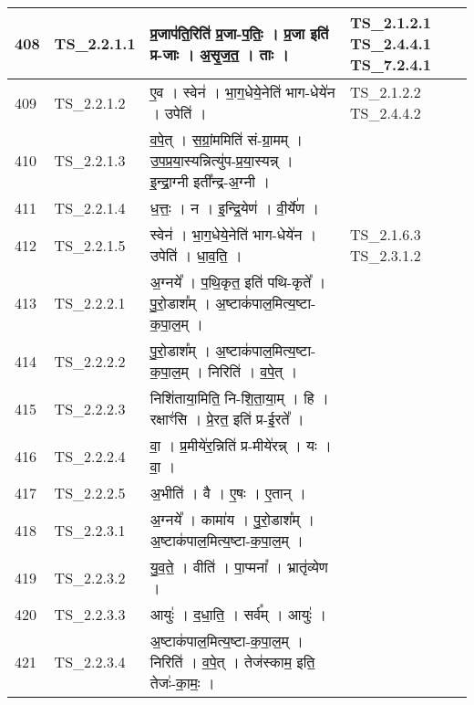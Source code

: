 \documentclass[17pt]{extarticle}
\begin{document}
\begin{longtable}{||p{0.4in}||p{0.9in}||p{4.0in}||p{0.9in}||}
        \hline
            408 & TS\_2.2.1.1 & प्र॒जाप॑ति॒रिति॑ प्र॒जा{-}प॒तिः॒   ।   प्र॒जा इति॑ प्र{-}जाः   ।   अ॒सृ॒ज॒त॒   ।   ताः   ।    & TS\_2.1.2.1  TS\_2.4.4.1 TS\_7.2.4.1       \\
        \hline
            409 & TS\_2.2.1.2 & ए॒व   ।   स्वेन॑   ।   भा॒ग॒धेये॒नेति॑ भाग{-}धेये॑न   ।   उपेति॑   ।    & TS\_2.1.2.2  TS\_2.4.4.2       \\
        \hline
            410 & TS\_2.2.1.3 & व॒पे॒त्   ।   स॒ग्रां॒ममिति॑ सं{-}ग्रा॒मम्   ।   उ॒प॒प्र॒या॒स्यन्नित्यु॑प{-}प्र॒या॒स्यन्न्   ।   इ॒न्द्रा॒ग्नी इती᳚न्द्र{-}अ॒ग्नी   ।    &      \\
        \hline
            411 & TS\_2.2.1.4 & ध॒त्तः॒   ।   न   ।   इ॒न्द्रि॒येण॑   ।   वी॒र्ये॑ण   ।    &      \\
        \hline
            412 & TS\_2.2.1.5 & स्वेन॑   ।   भा॒ग॒धेये॒नेति॑ भाग{-}धेये॑न   ।   उपेति॑   ।   धा॒व॒ति॒   ।    & TS\_2.1.6.3  TS\_2.3.1.2       \\
        \hline
            413 & TS\_2.2.2.1 & अ॒ग्नये᳚   ।   प॒थि॒कृत॒ इति॑ पथि{-}कृते᳚   ।   पु॒रो॒डाश᳚म्   ।   अ॒ष्टाक॑पाल॒मित्य॒ष्टा{-}क॒पा॒ल॒म्   ।    &      \\
        \hline
            414 & TS\_2.2.2.2 & पु॒रो॒डाश᳚म्   ।   अ॒ष्टाक॑पाल॒मित्य॒ष्टा{-}क॒पा॒ल॒म्   ।   निरिति॑   ।   व॒पे॒त्   ।    &      \\
        \hline
            415 & TS\_2.2.2.3 & निशि॑ताया॒मिति॒ नि{-}शि॒ता॒या॒म्   ।   हि   ।   रक्षाꣳ॑सि   ।   प्रे॒रत॒ इति॑ प्र{-}ई॒रते᳚   ।    &      \\
        \hline
            416 & TS\_2.2.2.4 & वा॒   ।   प्र॒मीये॑र॒न्निति॑ प्र{-}मीये॑रन्न्   ।   यः   ।   वा॒   ।    &      \\
        \hline
            417 & TS\_2.2.2.5 & अ॒भीति॑   ।   वै   ।   ए॒षः   ।   ए॒तान्   ।    &      \\
        \hline
            418 & TS\_2.2.3.1 & अ॒ग्नये᳚   ।   कामा॑य   ।   पु॒रो॒डाश᳚म्   ।   अ॒ष्टाक॑पाल॒मित्य॒ष्टा{-}क॒पा॒ल॒म्   ।    &      \\
        \hline
            419 & TS\_2.2.3.2 & यु॒व॒ते॒   ।   वीति॑   ।   पा॒प्मना᳚   ।   भ्रातृ॑व्येण   ।    &      \\
        \hline
            420 & TS\_2.2.3.3 & आयुः॑   ।   द॒धा॒ति॒   ।   सर्व᳚म्   ।   आयुः॑   ।    &      \\
        \hline
            421 & TS\_2.2.3.4 & अ॒ष्टाक॑पाल॒मित्य॒ष्टा{-}क॒पा॒ल॒म्   ।   निरिति॑   ।   व॒पे॒त्   ।   तेज॑स्काम॒ इति॒ तेजः॑{-}का॒मः॒   ।    &      \\

\end{longtable}
\end{document}
